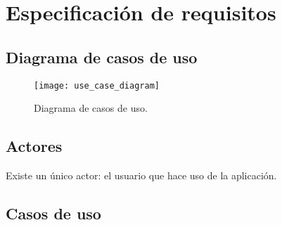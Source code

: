 \newpage

\section{Especificación de requisitos}

\subsection{Diagrama de casos de uso}

\begin{figure}[h!]
	\centering
	\texttt{[image: use\_case\_diagram]}
	\vspace{-0.5cm}
	\caption{Diagrama de casos de uso.}
	\label{flutter-widgets}
\end{figure}

\subsection{Actores}

Existe un único actor: el usuario que hace uso de la aplicación.


\subsection{Casos de uso}

